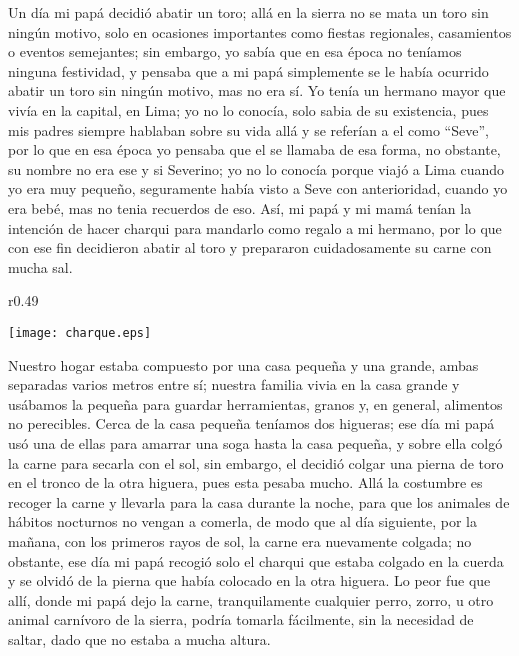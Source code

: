 Un día mi papá decidió abatir un toro; allá en la sierra no se mata un toro sin ningún motivo, solo en ocasiones importantes como fiestas regionales, casamientos o eventos semejantes; sin embargo, yo sabía que en esa época no teníamos ninguna festividad, y pensaba que a mi papá simplemente se le había ocurrido abatir un toro sin ningún motivo, mas no era sí.
Yo tenía un hermano mayor que vivía en la capital, en Lima; yo no lo conocía, solo sabia de su existencia, pues mis padres siempre hablaban sobre su vida allá y se referían a el como ``Seve'', por lo que en esa época yo pensaba que el se llamaba de esa forma, no obstante, su nombre no era ese y si Severino; yo no lo conocía porque viajó a Lima cuando yo era muy pequeño, seguramente había visto a Seve con anterioridad, cuando yo era bebé, mas no tenia recuerdos de eso.
Así, mi papá y mi mamá tenían la intención de hacer charqui para mandarlo como regalo a mi hermano, por lo que con ese fin decidieron abatir al toro y prepararon cuidadosamente su carne con mucha sal.

\begin{wrapfigure}{r}{0.49\textwidth}
  \begin{center}
  \vspace{-20pt}
    \texttt{[image: charque.eps]}
  \end{center}
  \vspace{-20pt}
\end{wrapfigure}
Nuestro hogar estaba compuesto por una casa pequeña y una grande, ambas separadas varios metros entre sí; nuestra familia vivia en la casa grande y usábamos la pequeña para guardar herramientas, granos y, en general, alimentos no perecibles.
Cerca de la casa pequeña teníamos dos higueras; ese día mi papá usó una de ellas para amarrar una soga hasta la casa pequeña, y sobre ella colgó la carne para secarla con el sol, sin embargo, el decidió colgar una pierna de toro en el tronco de la otra higuera, pues esta pesaba mucho.
Allá la costumbre es recoger la carne y llevarla para la casa durante la noche, para que los animales de hábitos nocturnos no vengan a comerla, de modo que al día siguiente, por la mañana, con los primeros rayos de sol, la carne era nuevamente colgada; no obstante, ese día mi papá recogió solo el charqui que estaba colgado en la cuerda y se olvidó de la pierna que había colocado en la otra higuera.
Lo peor fue que allí, donde mi papá dejo la carne, tranquilamente cualquier perro, zorro, u otro animal carnívoro de la sierra, podría tomarla fácilmente, sin la necesidad de saltar, dado que no estaba a mucha altura.

